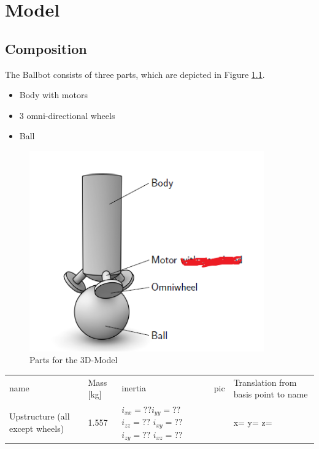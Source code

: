 \documentclass[twoside,colorback,accentcolor=tud4c,11pt]{tudreport}
\begin{document}
	\chapter{Model}
	
	\section{Composition}
	The Ballbot consists of three parts, which are depicted in Figure \ref{fig:Structure}.
	
	\begin{itemize}
		\item Body with motors
		\item 3 omni-directional wheels
		\item Ball
	\end{itemize}
	
	
	\begin{figure}[htbp]
		\centering
		\includegraphics[width=0.9\textwidth]{img/Strucuture.PNG}
		\caption{Parts for the 3D-Model}
		\label{fig:Structure}
	\end{figure}
	
	\begin{tabular}{l l p{15mm} l p{60mm}}
		name & Mass [kg] & inertia & pic &Translation from basis point to name\\
		Upstructure (all except wheels)&1.557 &$i_{xx}=??$\newline $i_{yy}=??$
		\newline $i_{zz}=??$ \newline $i_{xy}=??$ \newline $i_{zy}=??$ \newline $i_{xz}=??$& &x= \newline y= \newline z= \\
	\end{tabular}
	
\end{document}
